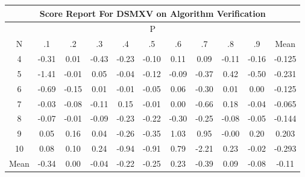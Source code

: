 \documentclass[11pt,a4paper]{report}
\begin{document}
\begin{longtable}{ | c || c | c | c | c | c | c | c | c | c || c |}
\hline
\multicolumn{11}{|c|}{ Score Report For DSMXV on Algorithm Verification} \\
\hline
\multicolumn{11}{|c|}{ P } \\
\hline
N & .1 & .2 & .3 & .4 & .5 & .6 & .7 & .8 & .9 & Mean\\
 \hline
 \hline
 \endhead
  4 &  \cellcolor[HTML]{FFF7F7} -0.31 &  \cellcolor[HTML]{FFFFFF} 0.01 &  \cellcolor[HTML]{FFF7F7} -0.43 &  \cellcolor[HTML]{FFF7F7} -0.23 &  \cellcolor[HTML]{FFFFFF} -0.10 &  \cellcolor[HTML]{FFFFFF} 0.11 &  \cellcolor[HTML]{FFFFFF} 0.09 &  \cellcolor[HTML]{FFFFFF} -0.11 &  \cellcolor[HTML]{FFF7F7} -0.16 & -0.125 \\
  5 &  \cellcolor[HTML]{FFDFDF} -1.41 &  \cellcolor[HTML]{FFFFFF} -0.01 &  \cellcolor[HTML]{FFFFFF} 0.05 &  \cellcolor[HTML]{FFFFFF} -0.04 &  \cellcolor[HTML]{FFFFFF} -0.12 &  \cellcolor[HTML]{FFFFFF} -0.09 &  \cellcolor[HTML]{FFF7F7} -0.37 &  \cellcolor[HTML]{F7F7FF} 0.42 &  \cellcolor[HTML]{FFEFEF} -0.50 & -0.231 \\
  6 &  \cellcolor[HTML]{FFEFEF} -0.69 &  \cellcolor[HTML]{FFFFFF} -0.15 &  \cellcolor[HTML]{FFFFFF} 0.01 &  \cellcolor[HTML]{FFFFFF} -0.01 &  \cellcolor[HTML]{FFFFFF} -0.05 &  \cellcolor[HTML]{FFFFFF} 0.06 &  \cellcolor[HTML]{FFF7F7} -0.30 &  \cellcolor[HTML]{FFFFFF} 0.01 &  \cellcolor[HTML]{FFFFFF} 0.00 & -0.125 \\
  7 &  \cellcolor[HTML]{FFFFFF} -0.03 &  \cellcolor[HTML]{FFFFFF} -0.08 &  \cellcolor[HTML]{FFFFFF} -0.11 &  \cellcolor[HTML]{FFFFFF} 0.15 &  \cellcolor[HTML]{FFFFFF} -0.01 &  \cellcolor[HTML]{FFFFFF} 0.00 &  \cellcolor[HTML]{FFEFEF} -0.66 &  \cellcolor[HTML]{F7F7FF} 0.18 &  \cellcolor[HTML]{FFFFFF} -0.04 & -0.065 \\
  8 &  \cellcolor[HTML]{FFFFFF} -0.07 &  \cellcolor[HTML]{FFFFFF} -0.01 &  \cellcolor[HTML]{FFFFFF} -0.09 &  \cellcolor[HTML]{FFF7F7} -0.23 &  \cellcolor[HTML]{FFF7F7} -0.22 &  \cellcolor[HTML]{FFF7F7} -0.30 &  \cellcolor[HTML]{FFF7F7} -0.25 &  \cellcolor[HTML]{FFFFFF} -0.08 &  \cellcolor[HTML]{FFFFFF} -0.05 & -0.144 \\
  9 &  \cellcolor[HTML]{FFFFFF} 0.05 &  \cellcolor[HTML]{F7F7FF} 0.16 &  \cellcolor[HTML]{FFFFFF} 0.04 &  \cellcolor[HTML]{FFF7F7} -0.26 &  \cellcolor[HTML]{FFF7F7} -0.35 &  \cellcolor[HTML]{E7E7FF} 1.03 &  \cellcolor[HTML]{E7E7FF} 0.95 &  \cellcolor[HTML]{FFFFFF} -0.00 &  \cellcolor[HTML]{F7F7FF} 0.20 & 0.203 \\
  10 &  \cellcolor[HTML]{FFFFFF} 0.08 &  \cellcolor[HTML]{FFFFFF} 0.10 &  \cellcolor[HTML]{F7F7FF} 0.24 &  \cellcolor[HTML]{FFE7E7} -0.94 &  \cellcolor[HTML]{FFE7E7} -0.91 &  \cellcolor[HTML]{EFEFFF} 0.79 &  \cellcolor[HTML]{FFC7C7} -2.21 &  \cellcolor[HTML]{F7F7FF} 0.23 &  \cellcolor[HTML]{FFFFFF} -0.02 & -0.293 \\
 \hline
 \hline
Mean &  \cellcolor[HTML]{FFF7F7} -0.34 &  \cellcolor[HTML]{FFFFFF} 0.00 &  \cellcolor[HTML]{FFFFFF} -0.04 &  \cellcolor[HTML]{FFF7F7} -0.22 &  \cellcolor[HTML]{FFF7F7} -0.25 &  \cellcolor[HTML]{F7F7FF} 0.23 &  \cellcolor[HTML]{FFF7F7} -0.39 &  \cellcolor[HTML]{FFFFFF} 0.09 &  \cellcolor[HTML]{FFFFFF} -0.08 &  \cellcolor[HTML]{FFFFFF} -0.11
\end{longtable}
\end{document}
